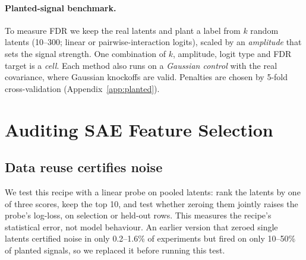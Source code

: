 \paragraph{Planted-signal benchmark.} To measure FDR we keep the real latents and plant a label from
$k$ random latents (10--300; linear or pairwise-interaction logits), scaled by an \emph{amplitude} that sets
the signal strength. One combination of $k$, amplitude, logit type and FDR target is a \emph{cell}. Each method also runs on a
\emph{Gaussian control} with the real covariance, where Gaussian knockoffs are valid. Penalties are
chosen by 5-fold cross-validation (Appendix~\ref{app:planted}). 

\section{Auditing SAE Feature Selection}
\label{sec:audit}

\subsection{Data reuse certifies noise}

\begin{table}[t]
\centering
\small
\setlength{\tabcolsep}{3.5pt}
\caption{Search-then-validate with a linear probe on pooled latents, under 500 label permutations: share of null experiments certifying
features (nominal 0.05), and latents passing an uncorrected scan (expected $0.05 \times 2{,}048 = 102$).
Ranges are over three scoring methods.}
\label{tab:reuse}
\end{table}

We test this recipe with a linear probe on pooled latents: rank the latents by one of three scores, keep the top 10, and
test whether zeroing them jointly raises the probe's log-loss, on selection or held-out rows. This measures the recipe's
statistical error, not model behaviour. An earlier version that zeroed single latents certified noise in only 0.2--1.6\% of
experiments but fired on only 10--50\% of planted signals, so we replaced it before running this test.

